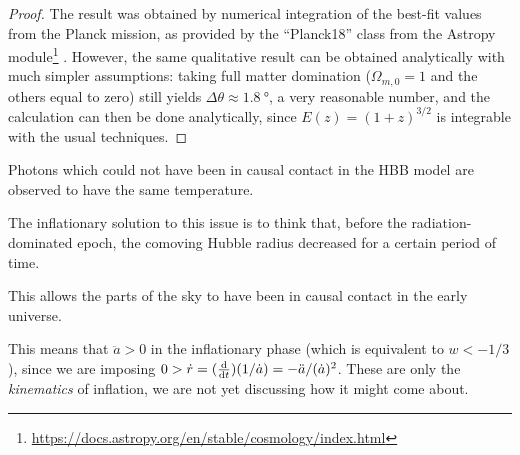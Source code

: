 \documentclass[main.tex]{subfiles}
\begin{document}
\begin{proof}
The result was obtained by numerical integration of the best-fit values from the Planck mission, as provided by the ``Planck18'' class from the Astropy module\footnote{\url{https://docs.astropy.org/en/stable/cosmology/index.html}} \cite[]{astropycollaborationAstropyProjectBuilding2018}. 
However, the same qualitative result can be obtained analytically with much simpler assumptions: taking full matter domination (\(\Omega_{m, 0} = 1\) and the others equal to zero) still yields \(\Delta \theta \approx \SI{1.8}{\degree}\), a very reasonable number, and the calculation can then be done analytically, since \(E(z) = (1 + z)^{3/2}\) is integrable with the usual techniques. 
\end{proof}

Photons which could not have been in causal contact in the HBB model are observed to have the same temperature. 

The inflationary solution to this issue is to think that, before the radiation-dominated epoch, the comoving Hubble radius decreased for a certain period of time.

This allows the parts of the sky to have been in causal contact in the early universe. 

This means that \(\ddot{a} > 0\) in the inflationary phase (which is equivalent to \(w < - 1/3\)), since we are imposing \(0 > \dot{r} = (\dv{}{t})(1/ \dot{a}) = - \ddot{a} / (\dot{a})^2\).
These are only the \emph{kinematics} of inflation, we are not yet discussing how it might come about. 
\end{document}
